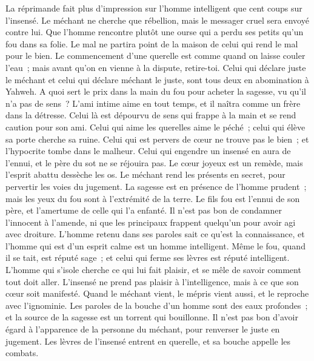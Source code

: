 \begin{multicols}{2}
La réprimande fait plus d'impression sur l'homme intelligent que cent coups sur l'insensé.
Le méchant ne cherche que rébellion, mais le messager cruel sera envoyé contre lui.
Que l'homme rencontre plutôt une ourse qui a perdu ses petits qu'un fou dans sa folie.
Le mal ne partira point de la maison de celui qui rend le mal pour le bien.
Le commencement d'une querelle est comme quand on laisse couler l'eau~; mais avant qu'on en vienne à la dispute, retire-toi.
Celui qui déclare juste le méchant et celui qui déclare méchant le juste, sont tous deux en abomination à Yahweh.
A quoi sert le prix dans la main du fou pour acheter la sagesse, vu qu'il n'a pas de sens~?
L'ami intime aime en tout temps, et il naîtra comme un frère dans la détresse.
Celui là est dépourvu de sens qui frappe à la main et se rend caution pour son ami.
Celui qui aime les querelles aime le péché~; celui qui élève sa porte cherche sa ruine.
Celui qui est pervers de cœur ne trouve pas le bien~; et l'hypocrite tombe dans le malheur.
Celui qui engendre un insensé en aura de l'ennui, et le père du sot ne se réjouira pas.
Le cœur joyeux est un remède, mais l'esprit abattu dessèche les os.
Le méchant rend les présents en secret, pour pervertir les voies du jugement.
La sagesse est en présence de l'homme prudent~; mais les yeux du fou sont à l'extrémité de la terre.
Le fils fou est l'ennui de son père, et l'amertume de celle qui l'a enfanté.
Il n'est pas bon de condamner l'innocent à l'amende, ni que les principaux frappent quelqu'un pour avoir agi avec droiture.
L'homme retenu dans ses paroles sait ce qu'est la connaissance, et l'homme qui est d'un esprit calme est un homme intelligent.
Même le fou, quand il se tait, est réputé sage~; et celui qui ferme ses lèvres est réputé intelligent.
\VerseOne{}L'homme qui s'isole cherche ce qui lui fait plaisir, et se mêle de savoir comment tout doit aller.
L'insensé ne prend pas plaisir à l'intelligence, mais à ce que son cœur soit manifesté.
Quand le méchant vient, le mépris vient aussi, et le reproche avec l'ignominie.
Les paroles de la bouche d'un homme sont des eaux profondes~; et la source de la sagesse est un torrent qui bouillonne.
Il n'est pas bon d'avoir égard à l'apparence de la personne du méchant, pour renverser le juste en jugement.
Les lèvres de l'insensé entrent en querelle, et sa bouche appelle les combats.

\end{multicols}
